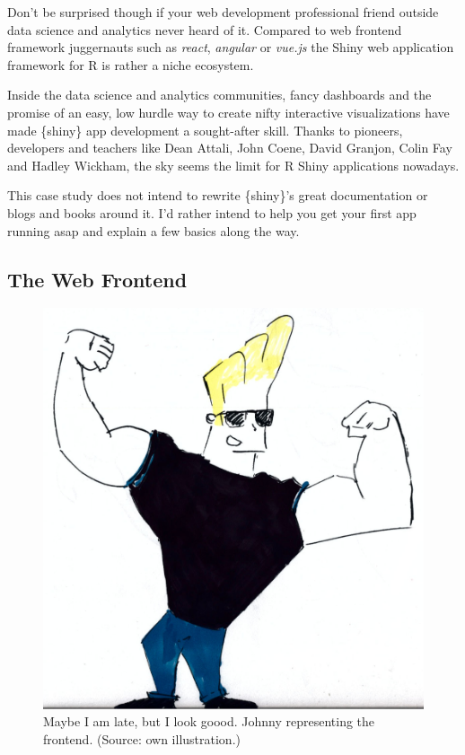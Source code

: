 \documentclass[
  12pt,
  letterpaper,
]{krantz}
\begin{document}
Don't be surprised though if your web development professional friend
outside data science and analytics never heard of it. Compared to web
frontend framework juggernauts such as \emph{react}, \emph{angular} or
\emph{vue.js} the Shiny web application framework for R is
rather a niche ecosystem.

Inside the data science and analytics communities, fancy dashboards and
the promise of an easy, low hurdle way to create nifty interactive
visualizations have made \{shiny\} app development a sought-after skill.
Thanks to pioneers, developers and teachers like Dean Attali, John
Coene, David Granjon, Colin Fay and Hadley Wickham, the sky seems the
limit for R Shiny applications nowadays.

This case study does not intend to rewrite \{shiny\}'s great
documentation or blogs and books around it. I'd rather intend to help
you get your first app running asap and explain a few basics along the
way.

\hypertarget{the-web-frontend}{%
\subsection{The Web Frontend}\label{the-web-frontend}}

\begin{figure}

{\centering \includegraphics{./images/johnny.png}

}

\caption{Maybe I am late, but I look goood. Johnny representing the
frontend. (Source: own illustration.)}

\end{figure}
\end{document}
